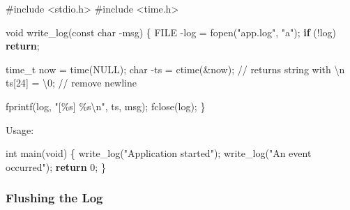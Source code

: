 \documentclass[
  letterpaper,
  DIV=11,
  numbers=noendperiod]{scrreprt}
\newenvironment{Shaded}{\begin{snugshade}}{\end{snugshade}}
\newcommand{\CharTok}[1]{\textcolor[rgb]{0.13,0.47,0.30}{#1}}
\newcommand{\CommentTok}[1]{\textcolor[rgb]{0.37,0.37,0.37}{#1}}
\newcommand{\ControlFlowTok}[1]{\textcolor[rgb]{0.00,0.23,0.31}{\textbf{#1}}}
\newcommand{\DataTypeTok}[1]{\textcolor[rgb]{0.68,0.00,0.00}{#1}}
\newcommand{\DecValTok}[1]{\textcolor[rgb]{0.68,0.00,0.00}{#1}}
\newcommand{\ImportTok}[1]{\textcolor[rgb]{0.00,0.46,0.62}{#1}}
\newcommand{\NormalTok}[1]{\textcolor[rgb]{0.00,0.23,0.31}{#1}}
\newcommand{\OperatorTok}[1]{\textcolor[rgb]{0.37,0.37,0.37}{#1}}
\newcommand{\PreprocessorTok}[1]{\textcolor[rgb]{0.68,0.00,0.00}{#1}}
\newcommand{\SpecialCharTok}[1]{\textcolor[rgb]{0.37,0.37,0.37}{#1}}
\newcommand{\StringTok}[1]{\textcolor[rgb]{0.13,0.47,0.30}{#1}}
\begin{document}
\begin{Shaded}
\begin{Highlighting}[]
\PreprocessorTok{\#include }\ImportTok{\textless{}stdio.h\textgreater{}}
\PreprocessorTok{\#include }\ImportTok{\textless{}time.h\textgreater{}}

\DataTypeTok{void}\NormalTok{ write\_log}\OperatorTok{(}\DataTypeTok{const} \DataTypeTok{char} \OperatorTok{{-}}\NormalTok{msg}\OperatorTok{)} \OperatorTok{\{}
    \DataTypeTok{FILE} \OperatorTok{{-}}\NormalTok{log }\OperatorTok{=}\NormalTok{ fopen}\OperatorTok{(}\StringTok{"app.log"}\OperatorTok{,} \StringTok{"a"}\OperatorTok{);}
    \ControlFlowTok{if} \OperatorTok{(!}\NormalTok{log}\OperatorTok{)} \ControlFlowTok{return}\OperatorTok{;}

    \DataTypeTok{time\_t}\NormalTok{ now }\OperatorTok{=}\NormalTok{ time}\OperatorTok{(}\NormalTok{NULL}\OperatorTok{);}
    \DataTypeTok{char} \OperatorTok{{-}}\NormalTok{ts }\OperatorTok{=}\NormalTok{ ctime}\OperatorTok{(\&}\NormalTok{now}\OperatorTok{);}      \CommentTok{// returns string with \textquotesingle{}\textbackslash{}n\textquotesingle{}}
\NormalTok{    ts}\OperatorTok{[}\DecValTok{24}\OperatorTok{]} \OperatorTok{=} \CharTok{\textquotesingle{}}\SpecialCharTok{\textbackslash{}0}\CharTok{\textquotesingle{}}\OperatorTok{;}               \CommentTok{// remove newline}

\NormalTok{    fprintf}\OperatorTok{(}\NormalTok{log}\OperatorTok{,} \StringTok{"[}\SpecialCharTok{\%s}\StringTok{] }\SpecialCharTok{\%s\textbackslash{}n}\StringTok{"}\OperatorTok{,}\NormalTok{ ts}\OperatorTok{,}\NormalTok{ msg}\OperatorTok{);}
\NormalTok{    fclose}\OperatorTok{(}\NormalTok{log}\OperatorTok{);}
\OperatorTok{\}}
\end{Highlighting}
\end{Shaded}

Usage:

\begin{Shaded}
\begin{Highlighting}[]
\DataTypeTok{int}\NormalTok{ main}\OperatorTok{(}\DataTypeTok{void}\OperatorTok{)} \OperatorTok{\{}
\NormalTok{    write\_log}\OperatorTok{(}\StringTok{"Application started"}\OperatorTok{);}
\NormalTok{    write\_log}\OperatorTok{(}\StringTok{"An event occurred"}\OperatorTok{);}
    \ControlFlowTok{return} \DecValTok{0}\OperatorTok{;}
\OperatorTok{\}}
\end{Highlighting}
\end{Shaded}

\subsubsection{Flushing the Log}\label{flushing-the-log}
\end{document}
